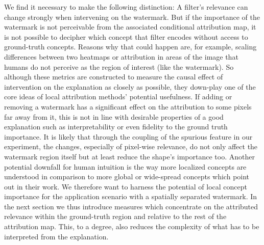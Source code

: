 We find it necessary to make the following distinction: A filter's relevance can change strongly when intervening on the watermark. But if the importance of the watermark is not perceivable from the associated conditional attribution map, it is not possible to decipher which concept that filter encodes without access to ground-truth concepts. Reasons why that could happen are, for example, scaling differences between two heatmaps or attribution in areas of the image that humans do not perceive as the region of interest (like the watermark).
So although these metrics are constructed to measure the causal effect of intervention on the explanation as closely as possible, they down-play one of the core ideas of local attribution methods' potential usefulness. If adding or removing a watermark has a significant effect on the attribution to some pixels far away from it, this is not in line with desirable properties of a good explanation such as interpretability or even fidelity to the ground truth importance. It is likely that through the coupling of the spurious feature in our experiment, the changes, especially of pixel-wise relevance, do not only affect the watermark region itself but at least reduce the shape's importance too. 
Another potential downfall for human intuition is the way more localized concepts are understood in comparison to more global or wide-spread concepts which \citet{Achtibat2022} point out in their work. We therefore want to harness the potential of local concept importance for the application scenario with a spatially separated watermark.
In the next section we thus introduce measures which concentrate on the attributed relevance within the ground-truth region and relative to the rest of the attribution map. This, to a degree, also reduces the complexity of what has to be interpreted from the explanation.
